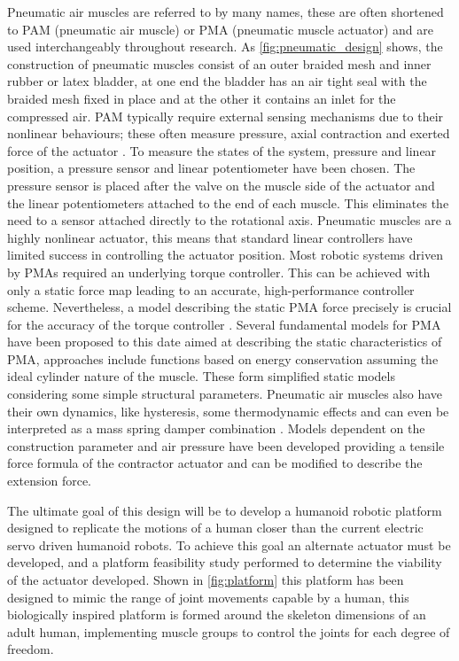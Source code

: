 \documentclass[11pt,a4paper]{article}
\begin{document}
Pneumatic air muscles are referred to by many names, these are often shortened to PAM (pneumatic air muscle) or PMA (pneumatic muscle actuator) and are used interchangeably throughout research. As \cref{fig:pneumatic_design} shows, the construction of pneumatic muscles consist of an outer braided mesh and inner rubber or latex bladder, at one end the bladder has an air tight seal with the braided mesh fixed in place and at the other it contains an inlet for the compressed air. PAM typically require external sensing mechanisms due to their nonlinear behaviours; these often measure pressure, axial contraction and exerted force of the actuator \cite{erin_pol_valle_park_2016}. To measure the states of the system, pressure and linear position, a pressure sensor and linear potentiometer have been chosen. The pressure sensor is placed after the valve on the muscle side of the actuator and the linear potentiometers attached to the end of each muscle. This eliminates the need to a sensor attached directly to the rotational axis. Pneumatic muscles are a highly nonlinear actuator, this means that standard linear controllers have limited success in controlling the actuator position. Most robotic systems driven by PMAs required an underlying torque controller. This can be achieved with only a static force map leading to an accurate, high-performance controller scheme. Nevertheless, a model describing the static PMA force precisely is crucial for the accuracy of the torque controller \cite{martens_boblan_2017}. Several fundamental models for PMA have been proposed to this date aimed at describing the static characteristics of PMA, approaches include functions based on energy conservation assuming the ideal cylinder nature of the muscle. These form simplified static models considering some simple structural parameters. Pneumatic air muscles also have their own dynamics, like hysteresis, some thermodynamic effects and can even be interpreted as a mass spring damper combination \cite{martens_boblan_2017}. Models dependent on the construction parameter and air pressure have been developed providing a tensile force formula of the contractor actuator and can be modified to describe the extension force.\newline

The ultimate goal of this design  will be to develop a humanoid robotic platform designed to replicate the motions of a human closer than the current electric servo driven humanoid robots. To achieve this goal an alternate actuator must be developed, and a platform feasibility study performed to determine the viability of the actuator developed. Shown in \cref{fig:platform} this platform has been designed to mimic the range of joint movements capable by a human, this biologically inspired platform is formed around the skeleton dimensions of an adult human, implementing muscle groups to control the joints for each degree of freedom. \newline
\end{document}
